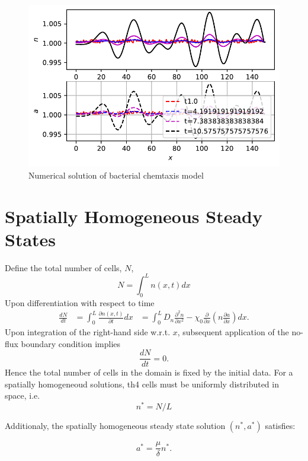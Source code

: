\documentclass[
  letterpaper,
  DIV=11,
  numbers=noendperiod]{scrreprt}
\theoremstyle{definition}
\theoremstyle{plain}
\theoremstyle{plain}
\theoremstyle{remark}
\begin{document}
\begin{figure}

{\centering \includegraphics{BacterialChemotaxis_files/figure-pdf/fig-bacterialchemotaxispde-output-1.pdf}

}

\caption{\label{fig-bacterialchemotaxispde}Numerical solution of
bacterial chemtaxis model}

\end{figure}

\hypertarget{spatially-homogeneous-steady-states-1}{%
\section{Spatially Homogeneous Steady
States}\label{spatially-homogeneous-steady-states-1}}

Define the total number of cells, \(N\), \[
N= \int_0^L n(x,t)dx
\] Upon differentiation with respect to time \[
\begin{aligned}
\frac{dN}{dt} &=\int_0^L \frac{\partial n(x,t)}{\partial t}dx
&=\int_0^L  D_n \frac{\partial ^2 n}{\partial x^2} - \chi_0 \frac{\partial}{\partial x} \left( n \frac{\partial a}{\partial x} \right) dx.
\end{aligned}
\] Upon integration of the right-hand side w.r.t. \(x\), subsequent
application of the no-flux boundary condition implies \[
\frac{dN}{dt}=0.
\] Hence the total number of cells in the domain is fixed by the initial
data. For a spatially homogeneoud solutions, th4 cells must be uniformly
distributed in space, i.e. \[
n^*=N/L
\]

Additionaly, the spatially homogeneous steady state solution
\((n^* , a^* )\) satisfies:

\[
a^*=\frac{\mu}{\delta} n^*.
\]
\end{document}
